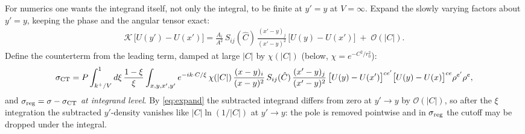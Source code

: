 \documentclass[11pt]{article}
\newcommand{\bA}{A}
\newcommand{\bC}{C}
\newcommand{\Chat}{\hat C}
\begin{document}
For numerics one wants the integrand itself, not only the integral, to
be finite at $y'=y$ at $V=\infty$.  Expand the slowly varying factors
about $y'=y$, keeping the phase and the angular tensor exact:
\begin{align}
\mathcal K\,\big[U(y')-U(x')\big]
=\frac{\bA_i}{\bA^2}\,S_{ij}(\Chat)\,\frac{(x'-y)_j}{(x'-y)^{2}}
\,\big[U(y)-U(x')\big]\;+\;\mathcal O(|\bC|) .
\label{eq:expand}
\end{align}
Define the counterterm from the leading term, damped at large $|\bC|$ by
$\chi(|\bC|)$ (below, $\chi=e^{-\bC^2/r_0^2}$):
\begin{align}
\sigma_{\rm CT}=P\int_{k^+/V}^{1}d\xi\,\frac{1-\xi}{\xi}
\int_{x,y,x',y'} e^{-ik\cdot\bC/\xi}\,\chi(|\bC|)\,
\frac{(x-y)_i}{(x-y)^2}\,S_{ij}(\Chat)\,\frac{(x'-y)_j}{(x'-y)^2}\,
\big[U(y)-U(x')\big]^{ce'}\big[U(y)-U(x)\big]^{ce}\rho^{e'}\rho^{e},
\label{eq:CT}
\end{align}
and $\sigma_{\rm reg}=\sigma-\sigma_{\rm CT}$ \emph{at integrand level}.
By \eqref{eq:expand} the subtracted integrand differs from zero at
$y'\to y$ by $\mathcal O(|\bC|)$, so after the $\xi$ integration the
subtracted $y'$-density vanishes like $|\bC|\ln(1/|\bC|)$ at $y'\to y$:
the pole is removed pointwise and in $\sigma_{\rm reg}$ the cutoff may
be dropped under the integral.
\end{document}
